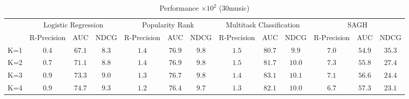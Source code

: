 \begin{table*}[!h]
\centering
\caption{Performance $\times 10^2$ (30music)}
\label{tab:perf_pla_30music}
\begin{tabular}{l|*{12}{c}}
\toprule
{} & \multicolumn{3}{c}{Logistic Regression} & \multicolumn{3}{c}{Popularity Rank} & \multicolumn{3}{c}{Multitask Classification} & \multicolumn{3}{c}{SAGH} \\
{} &    R-Precision &    AUC &  NDCG &     R-Precision &    AUC &  NDCG &              R-Precision &    AUC &   NDCG & R-Precision &    AUC &   NDCG \\
\midrule
K=1 &         $0.4$ & $67.1$ & $8.3$ &           $1.4$ & $76.9$ & $9.8$ &                    $1.5$ & $80.7$ &  $9.9$ &       $7.0$ & $54.9$ & $35.3$ \\
K=2 &         $0.7$ & $71.1$ & $8.8$ &           $1.4$ & $76.9$ & $9.8$ &                    $1.5$ & $81.7$ & $10.0$ &       $7.3$ & $55.8$ & $27.4$ \\
K=3 &         $0.9$ & $73.3$ & $9.0$ &           $1.3$ & $76.7$ & $9.8$ &                    $1.4$ & $83.1$ & $10.1$ &       $7.1$ & $56.6$ & $24.4$ \\
K=4 &         $0.9$ & $74.7$ & $9.3$ &           $1.2$ & $76.4$ & $9.7$ &                    $1.3$ & $82.1$ & $10.0$ &       $6.7$ & $57.3$ & $23.1$ \\
\bottomrule
\end{tabular}

\end{table*}
